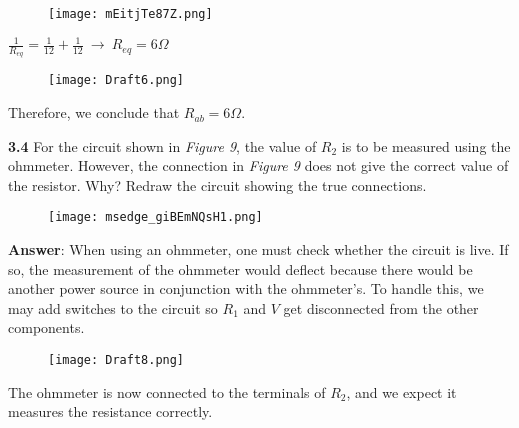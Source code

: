 \documentclass{article}
\begin{document}
{{\vspace{8mm}}

\begin{figure}[H]
    \centering
    \texttt{[image: mEitjTe87Z.png]}
\end{figure}

\begin{center}
{\Large $\displaystyle \frac1{R_{eq}} = \frac{1}{12} + \frac{1}{12} \ \rightarrow \ R_{eq} = 6 \Omega$}
\end{center}

{\vspace{8mm}}

\begin{figure}[H]
    \centering
    \texttt{[image: Draft6.png]}
\end{figure}

{\vspace{4mm}}

{\Large Therefore, we conclude that $\boxed{R_{ab} = 6 \Omega}$.}

{\vspace{8mm}}

\newpage

{\Large \textbf{3.4} For the circuit shown in \textit{Figure 9}, the value of $R_{2}$ is to be measured using the ohmmeter. However, the connection in \textit{Figure 9} does not give the correct value of the resistor. Why? Redraw the circuit showing the true connections.}

\begin{figure}[H]
    \centering
    \texttt{[image: msedge\_giBEmNQsH1.png]}
\end{figure}

{\Large \textbf{Answer}: When using an ohmmeter, one must check whether the circuit is live. If so, the measurement of the ohmmeter would deflect because there would be another power source in conjunction with the ohmmeter's. To handle this, we may add switches to the circuit so $R_1$ and $V$ get disconnected from the other components.}

\begin{figure}[H]
    \centering
    \texttt{[image: Draft8.png]}
\end{figure}

{\Large The ohmmeter is now connected to the terminals of $R_2$, and we expect it measures the resistance correctly.}

\vspace{8mm}

}
\end{document}
